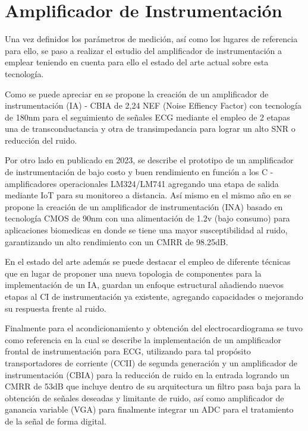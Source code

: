 \documentclass[conference]{IEEEtran}
\begin{document}
	\section{Amplificador de Instrumentación}
	
	Una vez definidos los parámetros de medición, así como los lugares de referencia para ello, se paso a realizar el estudio del amplificador de instrumentación a emplear teniendo en cuenta para ello el estado del arte actual sobre esta tecnología.
	
	Como se puede apreciar en \cite{9455865} se propone la creación de un amplificador de instrumentación (IA) - CBIA de 2,24 NEF (Noise Effiency Factor) con tecnología de 180nm para el seguimiento de señales ECG mediante el empleo de 2 etapas una de transconductancia y otra de transimpedancia para lograr un alto SNR o reducción del ruido.
	
	Por otro lado en \cite{10101028} publicado en 2023, se describe el prototipo de un amplificador de instrumentación de bajo costo y buen rendimiento en función a los C -  amplificadores operacionales LM324/LM741 agregando una etapa de salida mediante IoT para su monitoreo a distancia. Así mismo en el mismo año en \cite{10373502} se propone la creación de un amplificador de instrumentación (INA) basado en tecnología CMOS de 90nm con una alimentación de 1.2v (bajo consumo) para aplicaciones biomedicas en donde se tiene una mayor susceptibilidad al ruido, garantizando un alto rendimiento con un CMRR de 98.25dB.
	
	En el estado del arte además se puede destacar el empleo de diferente técnicas que en lugar de proponer una nueva topologia de componentes para la implementación de un IA, guardan un enfoque estructural añadiendo nuevos etapas al CI de instrumentación ya existente, agregando capacidades o mejorando su respuesta frente al ruido.
	
	Finalmente para el acondicionamiento y obtención del electrocardiograma se tuvo como referencia \cite{pantuprecharat2023ecg} en la cual se describe la implementación de un amplificador frontal de instrumentación para ECG, utilizando para tal propósito transportadores de corriente (CCII) de segunda generación y un amplificador de instrumentación (CBIA) para la reducción de ruido en la entrada logrando un CMRR de 53dB que incluye dentro de su arquitectura un filtro pasa baja para la obtención de señales deseadas y limitante de ruido, así como amplificador de ganancia variable (VGA) para finalmente integrar un ADC para el tratamiento de la señal de forma digital.
	
\end{document}
